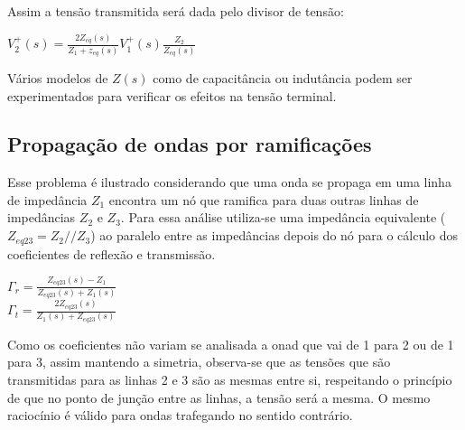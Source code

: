 Assim a tensão transmitida será dada pelo divisor de tensão:

\begin{center}
    $V_2^{+}(s) = \frac{2Z_{eq}(s)}{Z_1+z_{eq}(s)} V_1^{+}(s) \frac{Z_2}{Z_{eq}(s)}$
\end{center}

Vários modelos de $Z(s)$ como de capacitância ou indutância podem ser experimentados para verificar os efeitos na tensão terminal.


\subsection{Propagação de ondas por ramificações}

Esse problema é ilustrado considerando que uma onda se propaga em uma linha de impedância $Z_1$ encontra um nó que ramifica para duas outras linhas de impedâncias $Z_2$ e $Z_3$. Para essa análise utiliza-se uma impedância equivalente ($Z_{eq23}=Z_2//Z_3$) ao paralelo entre as impedâncias depois do nó para o cálculo dos coeficientes de reflexão e transmissão.

\begin{center}
    $\Gamma_{r} = \frac{Z_{eq23}(s)-Z_1}{Z_{eq23}(s)+Z_1(s)}$ \\ \vspace{1pt}
    $\Gamma_{t} = \frac{2Z_{eq23}(s)}{Z_1(s)+Z_{eq23}(s)}$
\end{center}

Como os coeficientes não variam se analisada a onad que vai de 1 para 2 ou de 1 para 3, assim mantendo a simetria, observa-se que as tensões que são transmitidas para as linhas 2 e 3 são as mesmas entre si, respeitando o princípio de que no ponto de junção entre as linhas, a tensão será a mesma. O mesmo raciocínio é válido para ondas trafegando no sentido contrário.